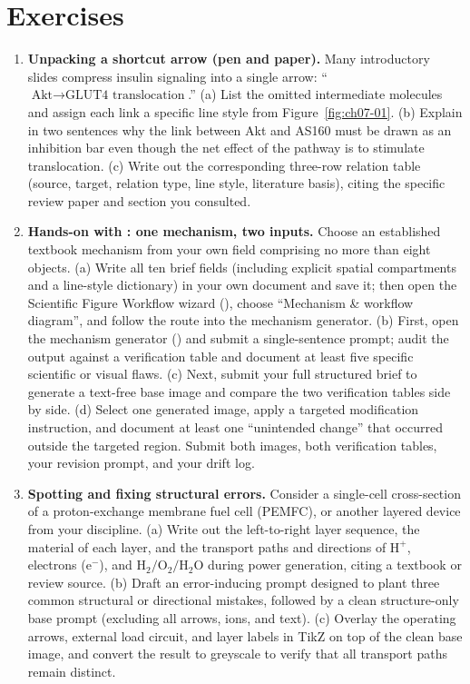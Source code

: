\section{Exercises}

\begin{enumerate}
\item \textbf{Unpacking a shortcut arrow (pen and paper).} Many introductory slides compress insulin signaling into a single arrow: ``$\text{Akt} \rightarrow \text{GLUT4 translocation}$.'' (a) List the omitted intermediate molecules and assign each link a specific line style from Figure~\ref{fig:ch07-01}. (b) Explain in two sentences why the link between Akt and AS160 must be drawn as an inhibition bar even though the net effect of the pathway is to stimulate translocation. (c) Write out the corresponding three-row relation table (source, target, relation type, line style, literature basis), citing the specific review paper and section you consulted.

\item \textbf{Hands-on with \scidraw{}: one mechanism, two inputs.} Choose an established textbook mechanism from your own field comprising no more than eight objects. (a) Write all ten brief fields (including explicit spatial compartments and a line-style dictionary) in your own document and save it; then open the Scientific Figure Workflow wizard (), choose ``Mechanism \& workflow diagram'', and follow the route into the mechanism generator. (b) First, open the mechanism generator () and submit a single-sentence prompt; audit the output against a verification table and document at least five specific scientific or visual flaws. (c) Next, submit your full structured brief to generate a text-free base image and compare the two verification tables side by side. (d) Select one generated image, apply a targeted modification instruction, and document at least one ``unintended change'' that occurred outside the targeted region. Submit both images, both verification tables, your revision prompt, and your drift log.

\item \textbf{Spotting and fixing structural errors.} Consider a single-cell cross-section of a proton-exchange membrane fuel cell (PEMFC), or another layered device from your discipline. (a) Write out the left-to-right layer sequence, the material of each layer, and the transport paths and directions of $\text{H}^+$, electrons ($\text{e}^-$), and $\text{H}_2/\text{O}_2/\text{H}_2\text{O}$ during power generation, citing a textbook or review source. (b) Draft an error-inducing prompt designed to plant three common structural or directional mistakes, followed by a clean structure-only base prompt (excluding all arrows, ions, and text). (c) Overlay the operating arrows, external load circuit, and layer labels in TikZ on top of the clean base image, and convert the result to greyscale to verify that all transport paths remain distinct.
\end{enumerate}

